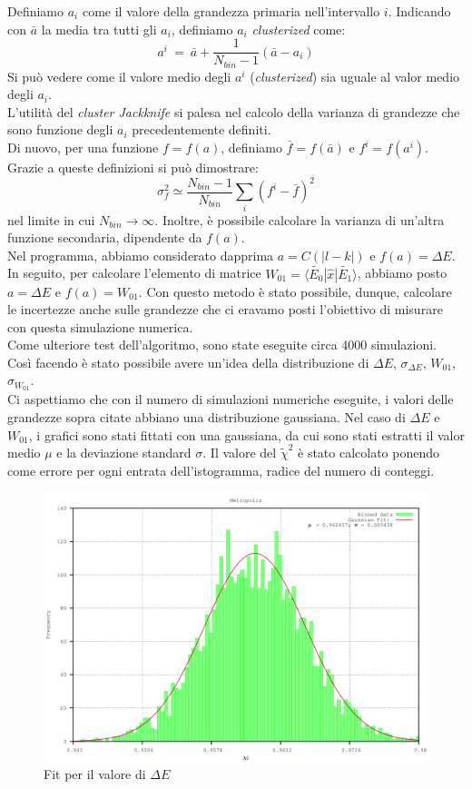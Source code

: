 Definiamo $ a_i$ come il valore della grandezza primaria nell'intervallo $i$. Indicando con $\bar{a}$ la media tra tutti gli $a_i$, definiamo $a_i$ \emph{clusterized} come:
$$
a^i \ = \ \bar{a} + \frac{1}{N_{bin} -1} \left( \bar{a} - a_i\right) 
$$
Si può vedere come il valore medio degli $a^i$ (\emph{clusterized}) sia uguale al valor medio degli $a_i$.\\
L'utilità del \emph{cluster Jackknife} si palesa nel calcolo della varianza di grandezze che sono funzione degli $a_i$ precedentemente definiti.\\
Di nuovo, per una funzione $ f  =  f(a)$, definiamo $ \bar{f}  =  f(\bar{a})$ e $ f^i  =  f( a^i)$. Grazie a queste definizioni si può
dimostrare:
$$
 \sigma_f^2 \simeq \frac{ N_{bin} - 1}{N_{bin}} \sum_i \left( f^i - \bar{f} \right)^2
$$
nel limite in cui $N_{bin} \rightarrow \infty$. Inoltre, è possibile calcolare la varianza di un'altra funzione secondaria,
dipendente da $f(a)$.\\
Nel programma, abbiamo considerato dapprima $ a = C( | l -k|) $ e $f(a) = \Delta E$.
In seguito, per calcolare l'elemento di matrice $ W_{01} =\langle \tilde{E_0} | \hat{x} | \tilde{E_1} \rangle $, abbiamo posto $a = \Delta E$ e $f(a) = W_{01}$.
Con questo metodo  è stato possibile, dunque, calcolare le incertezze anche sulle grandezze che ci eravamo posti l'obiettivo di misurare con questa simulazione numerica.\\
Come ulteriore test dell'algoritmo, sono state eseguite circa 4000 simulazioni.
Così facendo è stato possibile avere un'idea della distribuzione di $\Delta E$, $\sigma_{\Delta E}$, $W_{01}$, $\sigma_{W_{01}}$.\\
Ci aspettiamo che con il numero di simulazioni numeriche eseguite, i valori delle grandezze sopra citate abbiano una distribuzione gaussiana.
Nel caso di $\Delta E $ e $W_{01}$, i grafici sono stati fittati con una gaussiana,
da cui sono stati estratti il valor medio $\mu$ e la deviazione standard $\sigma$. Il valore del $\tilde{\chi}^2$ è stato calcolato ponendo come errore
per ogni entrata dell'istogramma, radice  del numero di conteggi.
\begin{figure}
\centering
 \includegraphics[width=\columnwidth]{fit-energy.pdf}
 \caption{\small{Fit per il valore di $\Delta E$}}
 \end{figure}
